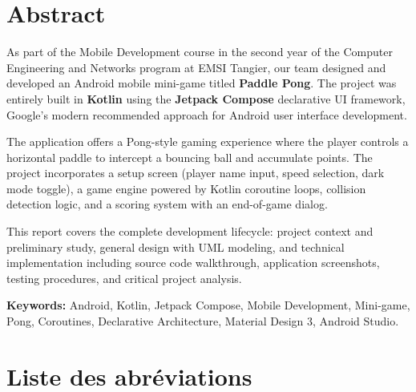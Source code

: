 \documentclass[12pt,a4paper]{report}
\begin{document}
\chapter*{Abstract}

As part of the Mobile Development course in the second year of the Computer Engineering and Networks program at EMSI Tangier, our team designed and developed an Android mobile mini-game titled \textbf{Paddle Pong}. The project was entirely built in \textbf{Kotlin} using the \textbf{Jetpack Compose} declarative UI framework, Google's modern recommended approach for Android user interface development.

The application offers a Pong-style gaming experience where the player controls a horizontal paddle to intercept a bouncing ball and accumulate points. The project incorporates a setup screen (player name input, speed selection, dark mode toggle), a game engine powered by Kotlin coroutine loops, collision detection logic, and a scoring system with an end-of-game dialog.

This report covers the complete development lifecycle: project context and preliminary study, general design with UML modeling, and technical implementation including source code walkthrough, application screenshots, testing procedures, and critical project analysis.

\medskip
\noindent\textbf{Keywords:} Android, Kotlin, Jetpack Compose, Mobile Development, Mini-game, Pong, Coroutines, Declarative Architecture, Material Design 3, Android Studio.

\newpage

\tableofcontents
\newpage
\listoffigures
{}
\newpage
\listoftables
{}
\newpage

\chapter*{Liste des abr\'eviations}
\end{document}
